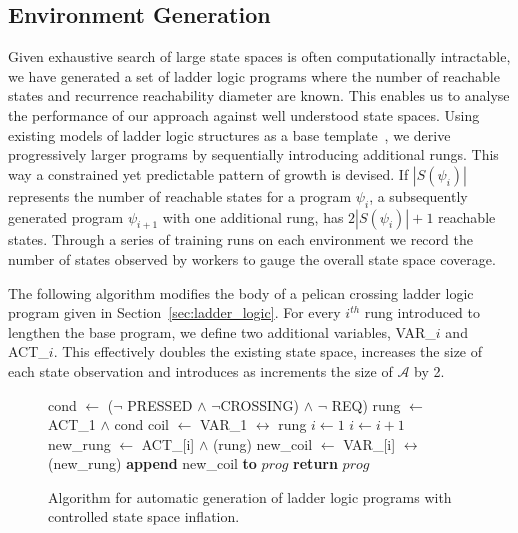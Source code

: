 \documentclass[runningheads]{llncs}
\begin{document}
\subsection{Environment Generation}
Given exhaustive search of large state spaces is often computationally intractable, we have generated a set of ladder logic programs where the number of reachable states and recurrence reachability diameter are known. This enables us to analyse the performance of our approach against well understood state spaces. Using existing models of ladder logic structures as a base template~\cite{james2013verification}, we derive progressively larger programs by sequentially introducing additional rungs. This way a constrained yet predictable pattern of growth is devised. If $|S(\psi_i)|$ represents the number of reachable states for a program $\psi_i$, a subsequently generated program $\psi_{i+1}$ with one additional rung, has $2|S(\psi_i)|+1$ reachable states. Through a series of training runs on each environment we record the number of states observed by workers to gauge the overall state space coverage. 

The following algorithm modifies the body of a pelican crossing ladder logic program given in Section~\ref{sec:ladder_logic}. For every $i^{th}$ rung introduced to lengthen the base program, we define two additional variables, VAR\_$i$ and ACT\_$i$. This effectively doubles the existing state space, increases the size of each state observation and introduces as increments the size of $\mathcal{A}$ by 2.
\begin{figure}[!h]
	\begin{algorithmic}\label{algo:ladder_generation}
		\State cond $\gets$ ($\lnot$ PRESSED $\land$ $\lnot$CROSSING) $\land$ $\lnot$ REQ)
		\State rung $\gets$ ACT\_1 $\land$ cond
		\State coil $\gets$ VAR\_1 $\leftrightarrow$ rung
		\State $i \gets 1$ 
		\State $i \gets i+1$
		\State new\_rung $\gets$ ACT\_[i] $\land$ (rung)
		\State new\_coil $\gets$ VAR\_[i] $\leftrightarrow$ (new\_rung)
		\State \textbf{append} new\_coil \textbf{to} $prog$
		\EndWhile
		\State \textbf{return} $prog$
		\EndProcedure
	\end{algorithmic}
	\caption{Algorithm for automatic generation of ladder logic programs with controlled state space inflation.}
	\label{fig:algorithm}
\end{figure}
\end{document}
